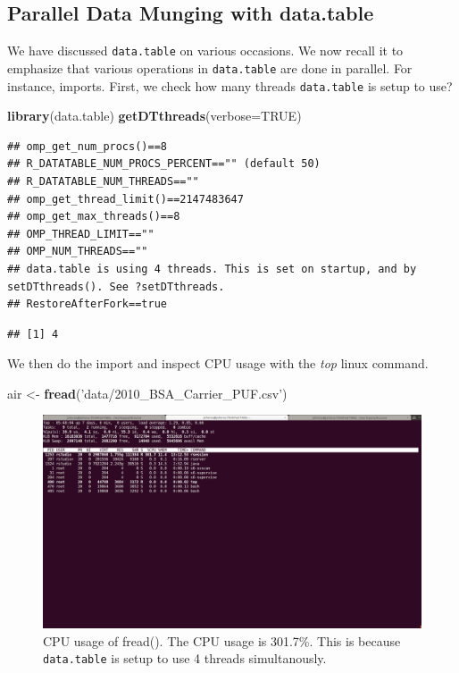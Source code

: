 \documentclass[]{book}
\newenvironment{Shaded}{\begin{snugshade}}{\end{snugshade}}
\newcommand{\DataTypeTok}[1]{\textcolor[rgb]{0.13,0.29,0.53}{#1}}
\newcommand{\KeywordTok}[1]{\textcolor[rgb]{0.13,0.29,0.53}{\textbf{#1}}}
\newcommand{\NormalTok}[1]{#1}
\newcommand{\OtherTok}[1]{\textcolor[rgb]{0.56,0.35,0.01}{#1}}
\newcommand{\StringTok}[1]{\textcolor[rgb]{0.31,0.60,0.02}{#1}}
\theoremstyle{definition}
\theoremstyle{definition}
\theoremstyle{definition}
\theoremstyle{remark}
\begin{document}
\hypertarget{parallel-data-munging-with-data.table}{%
\subsection{Parallel Data Munging with data.table}\label{parallel-data-munging-with-data.table}}

We have discussed \texttt{data.table} on various occasions.
We now recall it to emphasize that various operations in \texttt{data.table} are done in parallel.
For instance, imports.
First, we check how many threads \texttt{data.table} is setup to use?

\begin{Shaded}
\begin{Highlighting}[]
\KeywordTok{library}\NormalTok{(data.table)}
\KeywordTok{getDTthreads}\NormalTok{(}\DataTypeTok{verbose=}\OtherTok{TRUE}\NormalTok{) }
\end{Highlighting}
\end{Shaded}

\begin{verbatim}
## omp_get_num_procs()==8
## R_DATATABLE_NUM_PROCS_PERCENT=="" (default 50)
## R_DATATABLE_NUM_THREADS==""
## omp_get_thread_limit()==2147483647
## omp_get_max_threads()==8
## OMP_THREAD_LIMIT==""
## OMP_NUM_THREADS==""
## data.table is using 4 threads. This is set on startup, and by setDTthreads(). See ?setDTthreads.
## RestoreAfterFork==true
\end{verbatim}

\begin{verbatim}
## [1] 4
\end{verbatim}

We then do the import and inspect CPU usage with the \emph{top} linux command.

\begin{Shaded}
\begin{Highlighting}[]
\NormalTok{air <-}\StringTok{ }\KeywordTok{fread}\NormalTok{(}\StringTok{'data/2010_BSA_Carrier_PUF.csv'}\NormalTok{)}
\end{Highlighting}
\end{Shaded}

\begin{figure}
\centering
\includegraphics{art/Screenshot from 2019-10-03 10-48-06.png}
\caption{CPU usage of fread(). The CPU usage is 301.7\%. This is because \texttt{data.table} is setup to use 4 threads simultanously.}
\end{figure}
\end{document}
